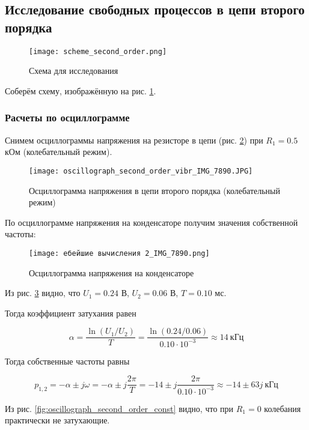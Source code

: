 \subsection{Исследование свободных процессов в цепи второго порядка}

\begin{figure}[!h]
    \centering
    \texttt{[image: scheme\_second\_order.png]}
    \caption{Схема для исследования}
    \label{fig:scheme_second_order}
\end{figure}

Соберём схему, изображённую на рис. \ref*{fig:scheme_second_order}.

\subsubsection{Расчеты по осциллограмме}

Снимем осциллограммы напряжения на резисторе в цепи
(рис. \ref*{fig:oscillograph_second_order}) при $R_1 = 0.5$ кОм (колебательный режим).

\begin{figure}[!h]
    \centering
    \texttt{[image: oscillograph\_second\_order\_vibr\_IMG\_7890.JPG]}
    \caption{Осциллограмма напряжения в цепи второго порядка (колебательный режим)}
    \label{fig:oscillograph_second_order}
\end{figure}

По осциллограмме напряжения на конденсаторе получим значения собственной частоты:

\begin{figure}[!h]
    \centering
    \texttt{[image: ебейшие вычисления 2\_IMG\_7890.png]}
    \caption{Осциллограмма напряжения на конденсаторе}
    \label{fig:culculations_second_order}
\end{figure}

Из рис. \ref*{fig:culculations_second_order} видно, что $U_1 = 0.24$ В, $U_2 = 0.06$ В, $T = 0.10$ мс.

Тогда коэффициент затухания равен

\[
    \alpha = \frac{\ln {(U_1 / U_2)} }{T}
    = \frac{\ln{(0.24/0.06)}}{0.10 \cdot 10^{-3}} \approx 14\ \text{кГц}
\]

Тогда собственные частоты равны

\[
    p_{1,2} = -\alpha \pm j \omega
    =  -\alpha \pm j \frac{2\pi}{T}
    = - 14 \pm j \frac{2\pi}{0.10 \cdot 10^{-3}} \approx -14 \pm 63j\ \text{кГц}
\]

Из рис. \ref*{fig:oscillograph_second_order_const} видно, что при $R_1 = 0$ колебания
практически не затухающие.

